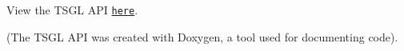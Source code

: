 View the T\+S\+G\+L A\+P\+I \href{http://calvin-cs.github.io/TSGL/html/annotated.html}{\tt here}.

(The T\+S\+G\+L A\+P\+I was created with Doxygen, a tool used for documenting code). 